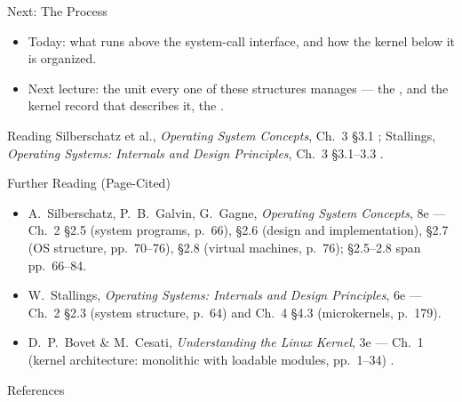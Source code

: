 \documentclass[aspectratio=169]{beamer}
\begin{document}
\begin{frame}{Next: The Process}
  \begin{itemize}
    \item Today: what runs above the system-call interface, and how the kernel
      below it is organized.
    \item Next lecture: the unit every one of these structures manages --- the
      , and the kernel record that describes it, the
      .
  \end{itemize}
  \vspace{0.3cm}
  \begin{block}{Reading}
    Silberschatz et al., \emph{Operating System Concepts}, Ch.~3 \S3.1
    \cite{SilberschatzOSC_operating_system_concepts}; Stallings,
    \emph{Operating Systems: Internals and Design Principles}, Ch.~3
    \S3.1--3.3 \cite{StallingsOS_internals_design_principles}.
  \end{block}
\end{frame}

\begin{frame}{Further Reading (Page-Cited)}
  \footnotesize
  \begin{itemize}
    \item A.~Silberschatz, P.~B.~Galvin, G.~Gagne, \emph{Operating System
      Concepts}, 8e --- Ch.~2 \S2.5 (system programs, p.~66), \S2.6 (design
      and implementation), \S2.7 (OS structure, pp.~70--76), \S2.8 (virtual
      machines, p.~76); \S2.5--2.8 span pp.~66--84.
    \item W.~Stallings, \emph{Operating Systems: Internals and Design
      Principles}, 6e --- Ch.~2 \S2.3 (system structure, p.~64) and Ch.~4
      \S4.3 (microkernels, p.~179).
    \item D.~P.~Bovet \& M.~Cesati, \emph{Understanding the Linux Kernel}, 3e
      --- Ch.~1 (kernel architecture: monolithic with loadable modules,
      pp.~1--34) \cite{BovetCesati_understanding_linux_kernel}.
  \end{itemize}
  \vspace{0.2cm}
\end{frame}

\begin{frame}[allowframebreaks]{References}
  \footnotesize\sloppy
  
  
\end{frame}
\end{document}
